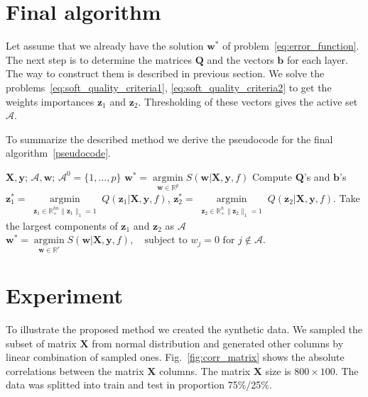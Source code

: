 \documentclass[a4paper,12pt]{article}
\theoremstyle{plain} %
\theoremstyle{definition} %
\theoremstyle{remark} %
\newcommand{\bb}{\mathbf{b}}
\newcommand{\bw}{\mathbf{w}}
\newcommand{\by}{\mathbf{y}}
\newcommand{\bz}{\mathbf{z}}
\newcommand{\cA}{\mathcal{A}}
\newcommand{\bQ}{\mathbf{Q}}
\newcommand{\bbR}{\mathbb{R}}
\newcommand{\bX}{\mathbf{X}}
\newcommand{\argmin}{\mathop{\arg \min}\limits}
\begin{document}
	\section{Final algorithm}
	Let assume that we already have the solution $\bw^*$ of problem~\ref{eq:error_function}.
	The next step is to determine the matrices $\bQ$ and the vectors $\bb$ for each layer. The way to construct them is described in previous section. 
	We solve the problems~\ref{eq:soft_quality_criteria1}, \ref{eq:soft_quality_criteria2} to get the weights importances $\bz_1$ and $\bz_2$. 
	Thresholding of these vectors gives the active set $\cA$.
	
	To summarize the described method we derive the pseudocode for the final algorithm~\ref{pseudocode}.
	
	
	\begin{algorithm}[h]
		\caption{}
		\label{pseudocode}
		\begin{algorithmic}[1]
			\REQUIRE $\bX, \by$;
			\ENSURE $\cA, \bw$;
			\STATE $\cA^0 = \{1, \dots, p\}$
			\STATE $\bw^* = \argmin_{\bw \in \bbR^p} S(\bw | \bX, \by, f)$
			\vspace{0.1cm}
			\STATE Compute $\bQ$'s and $\bb$'s			
			\vspace{0.1cm}
			\STATE 
			$\bz_1^* = \argmin_{\substack{\bz_1 \in \bbR^{hn}_{+} \| \bz_1 \|_1 = 1}} Q(\bz_1 | \bX, \by, f)$, \quad
			$\bz_2^* = \argmin_{\substack{ \bz_2 \in \bbR^{h}_{+} \| \bz_2 \|_1 = 1}} Q(\bz_2 | \bX, \by, f)$.			
			\vspace{0.1cm}
			\STATE Take the largest components of $\bz_1$ and $\bz_2$ as $\cA$
			\vspace{0.1cm}
			\STATE $\bw^* = \argmin_{\bw \in \bbR^r} S(\bw | \bX, \by, f), \quad \text{subject to } w_j = 0 \text{ for } j \notin \cA.$
		\end{algorithmic}
	\end{algorithm}

	\section*{Experiment}
	
	To illustrate the proposed method we created the synthetic data. 
	We sampled the subset of matrix $\bX$ from normal distribution and generated other columns by linear combination of sampled ones. 
	Fig.~\ref{fig:corr_matrix} shows the absolute correlations between the matrix $\bX$ columns.
	The matrix $\bX$ size is $800 \times 100$. 
	The data was splitted into train and test in proportion 75\%/25\%.
	
\end{document}
